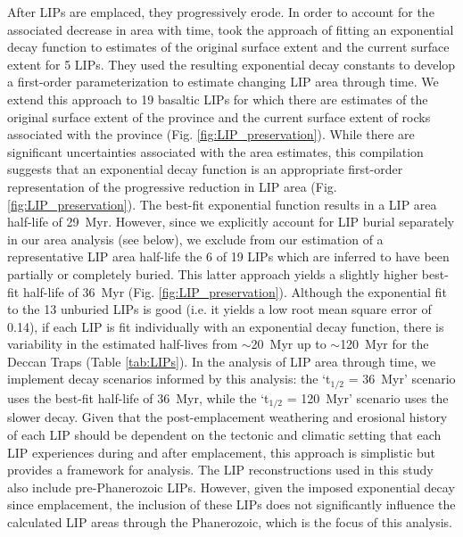 \documentclass[11pt,letterpaper]{article}
\begin{document}
After LIPs are emplaced, they progressively erode. In order to account for the associated decrease in area with time, \citet{Godderis2017a} took the approach of fitting an exponential decay function to estimates of the original surface extent and the current surface extent for 5 LIPs. They used the resulting exponential decay constants to develop a first-order parameterization to estimate changing LIP area through time. We extend this approach to 19 basaltic LIPs for which there are estimates of the original surface extent of the province and the current surface extent of rocks associated with the province (Fig. \ref{fig:LIP_preservation}). While there are significant uncertainties associated with the area estimates, this compilation suggests that an exponential decay function is an appropriate first-order representation of the progressive reduction in LIP area (Fig. \ref{fig:LIP_preservation}). The best-fit exponential function results in a LIP area half-life of 29~Myr. However, since we explicitly account for LIP burial separately in our area analysis (see below), we exclude from our estimation of a representative LIP area half-life the 6 of 19 LIPs which are inferred to have been partially or completely buried. This latter approach yields a slightly higher best-fit half-life of 36~Myr (Fig. \ref{fig:LIP_preservation}). Although the exponential fit to the 13 unburied LIPs is good (i.e. it yields a low root mean square error of 0.14), if each LIP is fit individually with an exponential decay function, there is variability in the estimated half-lives from $\sim$20~Myr up to $\sim$120~Myr for the Deccan Traps (Table \ref{tab:LIPs}). In the analysis of LIP area through time, we implement decay scenarios informed by this analysis: the `t$_{1/2}$ = 36~Myr' scenario uses the best-fit half-life of 36~Myr, while the `t$_{1/2}$ = 120~Myr' scenario uses the slower decay. Given that the post-emplacement weathering and erosional history of each LIP should be dependent on the tectonic and climatic setting that each LIP experiences during and after emplacement, this approach is simplistic but provides a framework for analysis. The LIP reconstructions used in this study also include pre-Phanerozoic LIPs. However, given the imposed exponential decay since emplacement, the inclusion of these LIPs does not significantly influence the calculated LIP areas through the Phanerozoic, which is the focus of this analysis.
\end{document}
